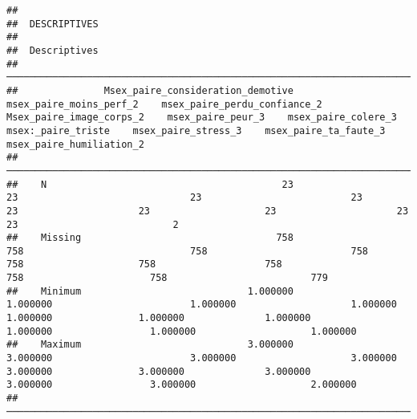 \documentclass[
]{article}
\begin{document}
\begin{verbatim}
## 
##  DESCRIPTIVES
## 
##  Descriptives                                                                                                                                                                                                                                                                          
##  ───────────────────────────────────────────────────────────────────────────────────────────────────────────────────────────────────────────────────────────────────────────────────────────────────────────────────────────────────────────────────────────────────────────────────── 
##               Msex_paire_consideration_demotive    msex_paire_moins_perf_2    msex_paire_perdu_confiance_2    Msex_paire_image_corps_2    msex_paire_peur_3    msex_paire_colere_3    msex:_paire_triste    msex_paire_stress_3    msex_paire_ta_faute_3    msex_paire_humiliation_2   
##  ───────────────────────────────────────────────────────────────────────────────────────────────────────────────────────────────────────────────────────────────────────────────────────────────────────────────────────────────────────────────────────────────────────────────────── 
##    N                                         23                         23                              23                          23                   23                     23                    23                     23                       23                           2   
##    Missing                                  758                        758                             758                         758                  758                    758                   758                    758                      758                         779   
##    Minimum                             1.000000                   1.000000                        1.000000                    1.000000             1.000000               1.000000              1.000000               1.000000                 1.000000                    1.000000   
##    Maximum                             3.000000                   3.000000                        3.000000                    3.000000             3.000000               3.000000              3.000000               3.000000                 3.000000                    2.000000   
##  ─────────────────────────────────────────────────────────────────────────────────────────────────────────────────────────────────────────────────────────────────────────────────────────────────────────────────────────────────────────────────────────────────────────────────────
\end{verbatim}
\end{document}
